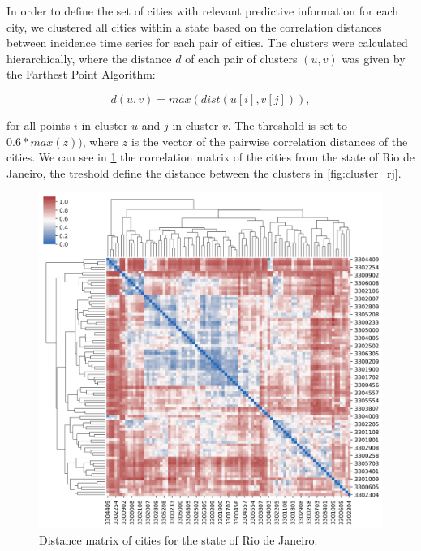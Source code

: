 \documentclass[12pt]{report}
\begin{document}
In order to define the set of cities with relevant predictive information for each city, we clustered all cities within a state based on the correlation distances between incidence time series for each pair of cities. The clusters were calculated hierarchically, where the distance $d$ of each pair of clusters $(u,v)$ was given by the Farthest Point Algorithm:

$$d(u,v) = max(dist(u[i],v[j])), $$

for all points $i$ in cluster $u$ and $j$ in cluster $v$. The threshold is set to $0.6*max(z))$, where $z$ is the vector of the pairwise correlation distances of the cities. We can see in  \ref{fig:corr_rj} the correlation matrix of the cities from the state of Rio de Janeiro, the treshold define the distance between the clusters in \ref{fig:cluster_rj}.

\begin{figure}
 \centering
 \includegraphics[scale=0.4]{cluster_corr_RJ.png}
 \caption{Distance matrix of cities for the state of Rio de Janeiro.}
 \label{fig:corr_rj}
\end{figure}
\end{document}
